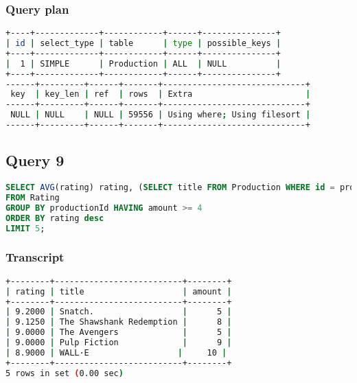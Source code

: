 \subsubsection{Query plan}
\begin{lstlisting}[language=bash]
+----+-------------+------------+------+---------------+
| id | select_type | table      | type | possible_keys |
+----+-------------+------------+------+---------------+
|  1 | SIMPLE      | Production | ALL  | NULL          |
+----+-------------+------------+------+---------------+
------+---------+------+-------+-----------------------------+
 key  | key_len | ref  | rows  | Extra                       |
------+---------+------+-------+-----------------------------+
 NULL | NULL    | NULL | 59556 | Using where; Using filesort |
------+---------+------+-------+-----------------------------+
\end{lstlisting}


\bigskip
\subsection{Query 9}
\begin{lstlisting}[language=sql]
SELECT AVG(rating) rating, (SELECT title FROM Production WHERE id = productionId) title, COUNT(*) amount
FROM Rating
GROUP BY productionId HAVING amount >= 4
ORDER BY rating desc
LIMIT 5;
\end{lstlisting}
\subsubsection{Transcript}
\begin{lstlisting}[language=bash]
+--------+--------------------------+--------+
| rating | title                    | amount |
+--------+--------------------------+--------+
| 9.2000 | Snatch.                  |      5 |
| 9.1250 | The Shawshank Redemption |      8 |
| 9.0000 | The Avengers             |      5 |
| 9.0000 | Pulp Fiction             |      9 |
| 8.9000 | WALL·E                  |     10 |
+--------+--------------------------+--------+
5 rows in set (0.00 sec)
\end{lstlisting}

